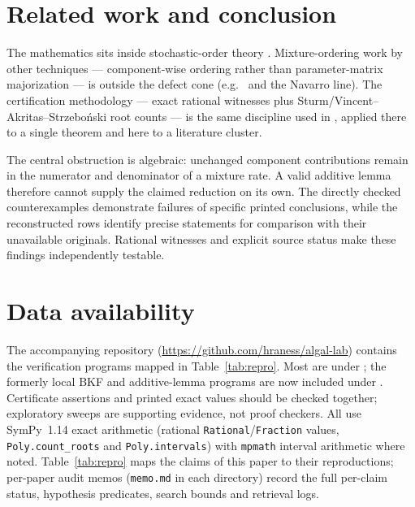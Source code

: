 \documentclass[10pt]{article}
\theoremstyle{plain}
\theoremstyle{definition}
\theoremstyle{remark}
\begin{document}
\section{Related work and conclusion}\label{sec:related}

The mathematics sits inside stochastic-order theory \cite{ShakedShanthikumar2007,MarshallOlkinArnold2011}. Mixture-ordering work by other techniques --- component-wise ordering rather than parameter-matrix majorization --- is outside the defect cone (e.g.\ \cite{FinkelsteinEsaulova2006,AminiSereshtZhang2017,BartoszewiczSkolimowska2006} and the Navarro line). The certification methodology --- exact rational witnesses plus Sturm/Vincent--Akritas--Strzebo\'nski root counts \cite{BasuPollackRoy2006,AkritasStrzebonski2005,Meurer2017} --- is the same discipline used in \cite{Guo2026hazard}, applied there to a single theorem and here to a literature cluster.

The central obstruction is algebraic: unchanged component contributions remain in the numerator and denominator of a mixture rate. A valid additive lemma therefore cannot supply the claimed reduction on its own. The directly checked counterexamples demonstrate failures of specific printed conclusions, while the reconstructed rows identify precise statements for comparison with their unavailable originals. Rational witnesses and explicit source status make these findings independently testable.

\section{Data availability}\label{sec:data}

The accompanying repository (\url{https://github.com/hraness/algal-lab}) contains the verification programs mapped in Table~\ref{tab:repro}. Most are under ; the formerly local BKF and additive-lemma programs are now included under . Certificate assertions and printed exact values should be checked together; exploratory sweeps are supporting evidence, not proof checkers. All use SymPy~1.14 exact arithmetic (rational \texttt{Rational}/\texttt{Fraction} values, \texttt{Poly.count\_roots} and \texttt{Poly.intervals}) with \texttt{mpmath} interval arithmetic where noted. Table~\ref{tab:repro} maps the claims of this paper to their reproductions; per-paper audit memos (\texttt{memo.md} in each directory) record the full per-claim status, hypothesis predicates, search bounds and retrieval logs.
\end{document}
